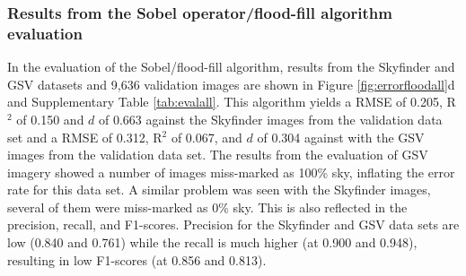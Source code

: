 \documentclass[final,3p,times,authoryear]{elsarticle}
\begin{document}
\subsubsection{Results from the \cite{Middel2018} Sobel operator/flood-fill algorithm evaluation}\label{sec:resultsflood}
In the evaluation of the Sobel/flood-fill algorithm, results from the Skyfinder and GSV datasets and 9,636 validation images are shown in Figure \ref{fig:errorfloodall}d and Supplementary Table \ref{tab:evalall}. This algorithm yields a RMSE of 0.205, R$^{2}$ of 0.150 and $d$ of 0.663 against the Skyfinder images from the validation data set and a RMSE of 0.312, R$^{2}$ of 0.067, and $d$ of 0.304 against with the GSV images from the validation data set. The results from the evaluation of GSV imagery showed a number of images miss-marked as 100\% sky, inflating the error rate for this data set. A similar problem was seen with the Skyfinder images, several of them were miss-marked as 0\% sky. This is also reflected in the precision, recall, and F1-scores. Precision for the Skyfinder and GSV data sets are low (0.840 and 0.761) while the recall is much higher (at 0.900 and 0.948), resulting in low F1-scores (at 0.856 and 0.813). 




\end{document}
